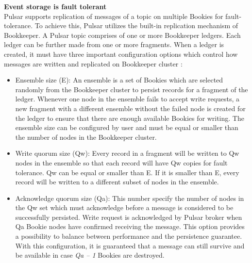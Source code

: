 \textbf{Event storage is fault tolerant}\\
Pulsar supports replication of messages of a topic on multiple Bookies for fault-tolerance. To achieve this, Pulsar utilizes the built-in replication mechanism of Bookkeeper. A Pulsar topic comprises of one or more Bookkeeper ledgers. Each ledger can be further made from one or more fragments. When a ledger is created, it must have three important configuration options which control how messages are written and replicated on Bookkeeper cluster \cite{bookkeeperprotocol}:
\begin{itemize}
	\item Ensemble size (E): An ensemble is a set of Bookies which are selected randomly from the Bookkeeper cluster to persist records for a fragment of the ledger. Whenever one node in the ensemble fails to accept write requests, a new fragment with a different ensemble without the failed node is created for the ledger to ensure that there are enough available Bookies for writing. The ensemble size can be configured by user and must be equal or smaller than the number of nodes in the Bookkeeper cluster.
	\item Write quorum size (Qw): Every record in a fragment will be written to Qw nodes in the ensemble so that each record will have Qw copies for fault tolerance. Qw can be equal or smaller than E. If it is smaller than E, every record will be written to a different subset of nodes in the ensemble.
	\item Acknowledge quorum size (Qa): This number specify the number of nodes in the Qw set which must acknowledge before a message is considered to be successfully persisted. Write request is acknowledged by Pulsar broker when Qa Bookie nodes have confirmed receiving the message. This option provides a possibility to balance between performance and the persistence guarantee. With this configuration, it is guaranteed that a message can still survive and be available in case \emph{Qa – 1} Bookies are destroyed.
\end{itemize}

